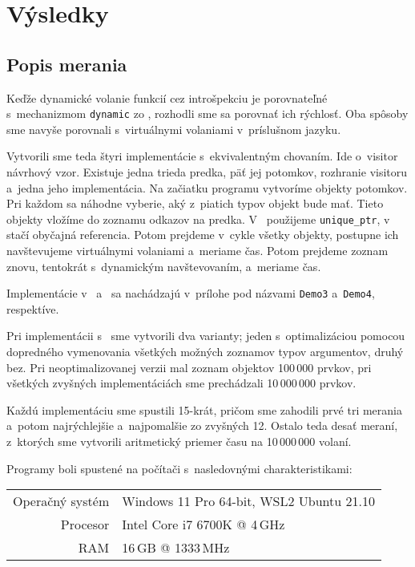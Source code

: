 \chapter{Výsledky} \label{vysledky}

\section{Popis merania}

Keďže dynamické volanie funkcií cez introšpekciu je porovnateľné s~mechanizmom \texttt{dynamic} zo \Csharp{}, rozhodli sme sa porovnať ich rýchlosť. Oba spôsoby sme navyše porovnali s~virtuálnymi volaniami v~príslušnom jazyku.

Vytvorili sme teda štyri implementácie s~ekvivalentným chovaním. Ide o~visitor návrhový vzor. Existuje jedna trieda predka, päť jej potomkov, rozhranie visitoru a~jedna jeho implementácia. Na začiatku programu vytvoríme objekty potomkov. Pri každom sa náhodne vyberie, aký z~piatich typov objekt bude mať. Tieto objekty vložíme do zoznamu odkazov na predka. V~\Cpp{} použijeme \texttt{unique\_ptr}, v~\Csharp{} stačí obyčajná referencia. Potom prejdeme v~cykle všetky objekty, postupne ich navštevujeme virtuálnymi volaniami a~meriame čas. Potom prejdeme zoznam znovu, tentokrát s~dynamickým navštevovaním, a~meriame čas.

Implementácie v~\Cpp{} a~\Csharp{} sa nachádzajú v~prílohe pod názvami \texttt{Demo3} a~\texttt{Demo4}, respektíve.

Pri implementácii s~\PPreflection{} sme vytvorili dva varianty; jeden s~optimalizáciou pomocou dopredného vymenovania všetkých možných zoznamov typov argumentov, druhý bez. Pri neoptimalizovanej verzii mal zoznam objektov 100\,000 prvkov, pri všetkých zvyšných implementáciách sme prechádzali 10\,000\,000 prvkov.

Každú implementáciu sme spustili 15-krát, pričom sme zahodili prvé tri merania a~potom najrýchlejšie a~najpomalšie zo zvyšných 12. Ostalo teda desať meraní, z~ktorých sme vytvorili aritmetický priemer času na 10\,000\,000 volaní.

Programy boli spustené na počítači s~nasledovnými charakteristikami:
\begin{table}[H]
\begin{tabular}{rl}
Operačný systém & Windows 11 Pro 64-bit, WSL2 Ubuntu 21.10 \\
Procesor & Intel Core i7 6700K @ 4\,GHz \\
RAM & 16\,GB @ 1333\,MHz \\
\end{tabular}
\end{table}

